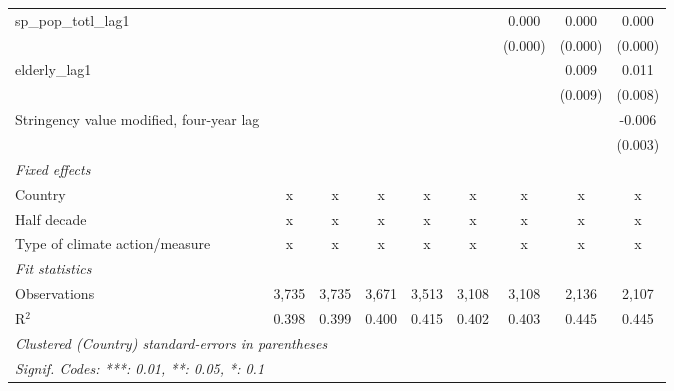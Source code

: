 \begin{tabular}{lcccccccc}
   sp\_pop\_totl\_lag1                                                 &         &         &         &         &         & 0.000   & 0.000        & 0.000\\   
                                                                       &         &         &         &         &         & (0.000) & (0.000)      & (0.000)\\   
   elderly\_lag1                                                       &         &         &         &         &         &         & 0.009        & 0.011\\   
                                                                       &         &         &         &         &         &         & (0.009)      & (0.008)\\   
   Stringency value modified, four-year lag                            &         &         &         &         &         &         &              & -0.006\\   
                                                                       &         &         &         &         &         &         &              & (0.003)\\   
   \emph{Fixed effects}\\
   Country                                                             & x       & x       & x       & x       & x       & x       & x            & x\\  
   Half decade                                                         & x       & x       & x       & x       & x       & x       & x            & x\\  
   Type of climate action/measure                                      & x       & x       & x       & x       & x       & x       & x            & x\\  
   \midrule \emph{Fit statistics}\\
   Observations                                                        & 3,735   & 3,735   & 3,671   & 3,513   & 3,108   & 3,108   & 2,136        & 2,107\\  
   R$^2$                                                               & 0.398   & 0.399   & 0.400   & 0.415   & 0.402   & 0.403   & 0.445        & 0.445\\  
   \midrule
   \multicolumn{9}{l}{\emph{Clustered (Country) standard-errors in parentheses}}\\
   \multicolumn{9}{l}{\emph{Signif. Codes: ***: 0.01, **: 0.05, *: 0.1}}\\
\end{tabular}
\par\endgroup


